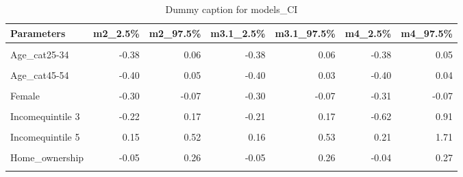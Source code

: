 \begin{table}
\centering
\caption{Dummy caption for models_CI}
\centering
\fontsize{10}{12}\selectfont
\begin{tabular}[t]{lrrrrrr}
\toprule
Parameters & m2\_2.5\% & m2\_97.5\% & m3.1\_2.5\% & m3.1\_97.5\% & m4\_2.5\% & m4\_97.5\%\\
\midrule
\cellcolor{gray!10}{(Intercept)} & \cellcolor{gray!10}{-3.20} & \cellcolor{gray!10}{-0.99} & \cellcolor{gray!10}{-2.91} & \cellcolor{gray!10}{-1.46} & \cellcolor{gray!10}{-3.38} & \cellcolor{gray!10}{-1.59}\\
Age\_cat25-34 & -0.38 & 0.06 & -0.38 & 0.06 & -0.38 & 0.05\\
\cellcolor{gray!10}{Age\_cat35-44} & \cellcolor{gray!10}{-0.46} & \cellcolor{gray!10}{-0.01} & \cellcolor{gray!10}{-0.46} & \cellcolor{gray!10}{-0.02} & \cellcolor{gray!10}{-0.47} & \cellcolor{gray!10}{-0.03}\\
Age\_cat45-54 & -0.40 & 0.05 & -0.40 & 0.03 & -0.40 & 0.04\\
\cellcolor{gray!10}{Age\_cat55+} & \cellcolor{gray!10}{-0.01} & \cellcolor{gray!10}{0.36} & \cellcolor{gray!10}{-0.01} & \cellcolor{gray!10}{0.35} & \cellcolor{gray!10}{0.00} & \cellcolor{gray!10}{0.36}\\
Female & -0.30 & -0.07 & -0.30 & -0.07 & -0.31 & -0.07\\
\cellcolor{gray!10}{Incomequintile 2} & \cellcolor{gray!10}{-0.23} & \cellcolor{gray!10}{0.17} & \cellcolor{gray!10}{-0.22} & \cellcolor{gray!10}{0.16} & \cellcolor{gray!10}{-0.47} & \cellcolor{gray!10}{1.14}\\
Incomequintile 3 & -0.22 & 0.17 & -0.21 & 0.17 & -0.62 & 0.91\\
\cellcolor{gray!10}{Incomequintile 4} & \cellcolor{gray!10}{0.03} & \cellcolor{gray!10}{0.41} & \cellcolor{gray!10}{0.04} & \cellcolor{gray!10}{0.40} & \cellcolor{gray!10}{-0.37} & \cellcolor{gray!10}{1.12}\\
Incomequintile 5 & 0.15 & 0.52 & 0.16 & 0.53 & 0.21 & 1.71\\
\cellcolor{gray!10}{Higher\_edu} & \cellcolor{gray!10}{0.08} & \cellcolor{gray!10}{0.32} & \cellcolor{gray!10}{0.08} & \cellcolor{gray!10}{0.32} & \cellcolor{gray!10}{0.07} & \cellcolor{gray!10}{0.33}\\
Home\_ownership & -0.05 & 0.26 & -0.05 & 0.26 & -0.04 & 0.27\\
\cellcolor{gray!10}{Dwelling\_house} & \cellcolor{gray!10}{0.00} & \cellcolor{gray!10}{0.30} & \cellcolor{gray!10}{0.00} & \cellcolor{gray!10}{0.30} & \cellcolor{gray!10}{0.00} & \cellcolor{gray!10}{0.30}\\

\end{tabular}
\end{table}
